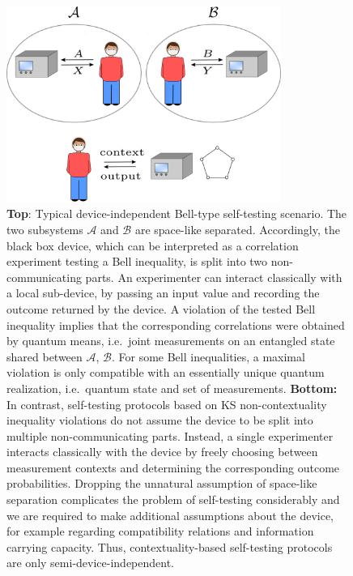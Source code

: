 \begin{figure}
    \centering
    \includegraphics[width=0.8\textwidth]{images/self-testing.png}
    \caption{\textbf{Top}: Typical device-independent Bell-type self-testing scenario. The two subsystems $\mathcal{A}$ and $\mathcal{B}$ are space-like separated. Accordingly, the black box device, which can be interpreted as a correlation experiment testing a Bell inequality, is split into two non-communicating parts. An experimenter can interact classically with a local sub-device, by passing an input value and recording the outcome returned by the device. A violation of the tested Bell inequality implies that the corresponding correlations were obtained by quantum means, i.e.\ joint measurements on an entangled state shared between $\mathcal{A}$, $\mathcal{B}$. For some Bell inequalities, a maximal violation is only compatible with an essentially unique quantum realization, i.e.\ quantum state and set of measurements.
    \textbf{Bottom:} In contrast, self-testing protocols based on KS non-contextuality inequality violations do not assume the device to be split into multiple non-communicating parts. Instead, a single experimenter interacts classically with the device by freely choosing between measurement contexts and determining the corresponding outcome probabilities. Dropping the unnatural assumption of space-like separation complicates the problem of self-testing considerably and we are required to make additional assumptions about the device, for example regarding compatibility relations and information carrying capacity. Thus, contextuality-based self-testing protocols are only semi-device-independent.}
    \label{fig:selftesting}
\end{figure}
